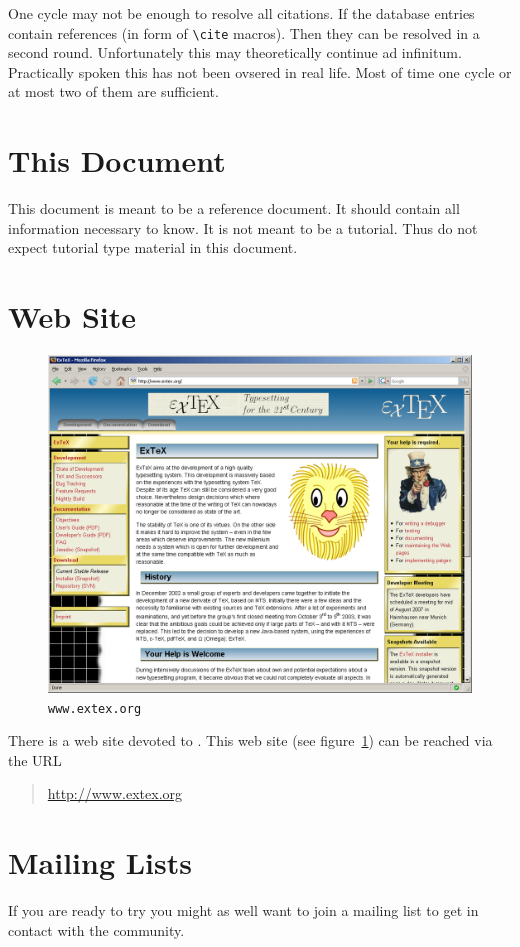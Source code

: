 One cycle may not be enough to resolve all citations. If the database
entries contain references (in form of \verb|\cite|
macros). Then they can be resolved in a
second round. Unfortunately this may theoretically continue ad
infinitum. Practically spoken this has not been ovsered in real life.
Most of time one cycle or at most two of them are sufficient.


\section{This Document}

This document is meant to be a reference document. It should contain
all information necessary to know. It is not meant to be a tutorial.
Thus do not expect tutorial type material in this document.


\section{Web Site}%

\begin{figure}[!h]
  \centering
  \includegraphics[width=.5\textwidth]{img/www-extex-org}\hfill
  \caption{\texttt{www.extex.org}}
  \label{fig:www.exetex.org}
\end{figure}
There is a web site devoted to \ExTeX. This
web site (see figure~\ref{fig:www.exetex.org}) can be reached via the
URL
\begin{quotation}
  \url{http://www.extex.org}
\end{quotation}


\section{Mailing Lists}

If you are ready to try \ExBib{} you might as well want to join a
mailing list to get in contact with the community.

